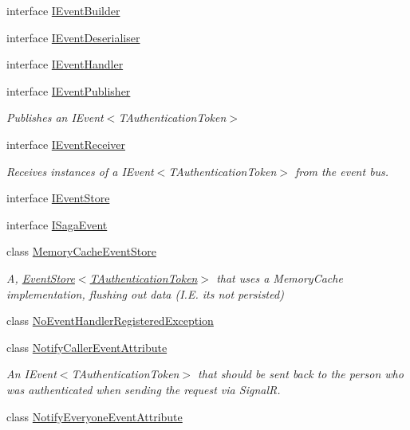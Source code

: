 \begin{DoxyCompactItemize}
interface \hyperlink{interfaceCqrs_1_1Events_1_1IEventBuilder}{I\+Event\+Builder}
\item 
interface \hyperlink{interfaceCqrs_1_1Events_1_1IEventDeserialiser}{I\+Event\+Deserialiser}
\item 
interface \hyperlink{interfaceCqrs_1_1Events_1_1IEventHandler}{I\+Event\+Handler}
\item 
interface \hyperlink{interfaceCqrs_1_1Events_1_1IEventPublisher}{I\+Event\+Publisher}
\begin{DoxyCompactList}\small\item\em Publishes an I\+Event$<$\+T\+Authentication\+Token$>$ \end{DoxyCompactList}\item 
interface \hyperlink{interfaceCqrs_1_1Events_1_1IEventReceiver}{I\+Event\+Receiver}
\begin{DoxyCompactList}\small\item\em Receives instances of a I\+Event$<$\+T\+Authentication\+Token$>$ from the event bus. \end{DoxyCompactList}\item 
interface \hyperlink{interfaceCqrs_1_1Events_1_1IEventStore}{I\+Event\+Store}
\item 
interface \hyperlink{interfaceCqrs_1_1Events_1_1ISagaEvent}{I\+Saga\+Event}
\item 
class \hyperlink{classCqrs_1_1Events_1_1MemoryCacheEventStore}{Memory\+Cache\+Event\+Store}
\begin{DoxyCompactList}\small\item\em A, \hyperlink{classCqrs_1_1Events_1_1EventStore_a6346cb2aea4c5b4e740dc6cfb15abab8}{Event\+Store$<$\+T\+Authentication\+Token$>$} that uses a Memory\+Cache implementation, flushing out data (I.\+E. it\textquotesingle{}s not persisted) \end{DoxyCompactList}\item 
class \hyperlink{classCqrs_1_1Events_1_1NoEventHandlerRegisteredException}{No\+Event\+Handler\+Registered\+Exception}
\item 
class \hyperlink{classCqrs_1_1Events_1_1NotifyCallerEventAttribute}{Notify\+Caller\+Event\+Attribute}
\begin{DoxyCompactList}\small\item\em An I\+Event$<$\+T\+Authentication\+Token$>$ that should be sent back to the person who was authenticated when sending the request via SignalR. \end{DoxyCompactList}\item 
class \hyperlink{classCqrs_1_1Events_1_1NotifyEveryoneEventAttribute}{Notify\+Everyone\+Event\+Attribute}

\end{DoxyCompactItemize}
